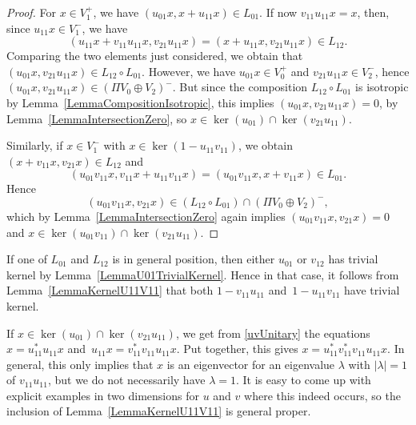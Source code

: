 \documentclass[pdftex]{sigma}
\numberwithin{equation}{section}
\begin{document}
\begin{proof}
For $x \in V_1^+$, we have $(u_{01} x, x+u_{11}x) \in L_{01}$.
If now $v_{11} u_{11} x = x$,
then, since $u_{11} x \in V_1^-$, we have
\begin{equation*}
 (u_{11} x + v_{11} u_{11} x, v_{21} u_{11} x) = (x + u_{11} x, v_{21} u_{11} x) \in L_{12}.
\end{equation*}
Comparing the two elements just considered, we obtain that $(u_{01} x, v_{21} u_{11} x) \in L_{12} \circ L_{01}$.
However, we have $u_{01} x \in V_0^+$ and $v_{21}u_{11}x \in V_2^-$, hence $(u_{01} x, v_{21} u_{11} x) \in (\Pi V_0 \oplus V_2)^-$.
But since the composition $L_{12} \circ L_{01}$ is isotropic by Lemma~\ref{LemmaCompositionIsotropic}, this implies $(u_{01} x, v_{21} u_{11} x) = 0$, by Lemma~\ref{LemmaIntersectionZero}, so $x \in \ker(u_{01}) \cap \ker(v_{21} u_{11})$.

Similarly, if $x \in V_1^-$ with $x \in\ker(1 - u_{11} v_{11})$, we obtain $(x+v_{11}x, v_{21}x) \in L_{12}$ and
\begin{equation*}
 (u_{01} v_{11} x, v_{11} x + u_{11} v_{11} x) = (u_{01} v_{11} x, x + v_{11} x) \in L_{01}.
\end{equation*}
Hence \[(u_{01} v_{11} x, v_{21} x) \in (L_{12} \circ L_{01}) \cap (\Pi V_0 \oplus V_2)^-,\] which by Lemma~\ref{LemmaIntersectionZero} again implies $(u_{01} v_{11} x, v_{21} x) = 0$ and $x \in \ker(u_{01} v_{11}) \cap \ker(v_{21} u_{11})$.
\end{proof}

\begin{Remark}
If one of $L_{01}$ and $L_{12}$ is in general position, then either $u_{01}$ or $v_{12}$ has trivial kernel by Lemma~\ref{LemmaU01TrivialKernel}.
Hence in that case, it follows from Lemma~\ref{LemmaKernelU11V11} that both $1 - v_{11} u_{11}$ and~${1- u_{11}v_{11}}$ have trivial kernel.
\end{Remark}

\begin{Remark}
If $x \in \ker(u_{01}) \cap \ker(v_{21} u_{11})$, we get from \eqref{uvUnitary} the equations $x = u_{11}^* u_{11} x$ and~${u_{11} x = v_{11}^* v_{11} u_{11}x}$.
Put together, this gives $x = u_{11}^* v_{11}^* v_{11} u_{11} x$.
In general, this only implies that $x$ is an eigenvector for an eigenvalue $\lambda$ with $|\lambda| = 1$ of $v_{11} u_{11}$, but we do not necessarily have $\lambda = 1$.
It is easy to come up with explicit examples in two dimensions for $u$ and $v$ where this indeed occurs, so the inclusion of Lemma~\ref{LemmaKernelU11V11} is general proper.
\end{Remark}
\end{document}
